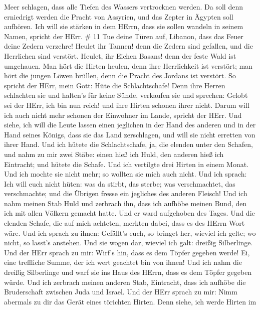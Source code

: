 Meer schlagen, dass alle Tiefen des Wassers vertrocknen werden. Da soll
denn erniedrigt werden die Pracht von Assyrien, und das Zepter in
Ägypten soll aufhören.  Ich will sie stärken in dem HErrn,
dass sie sollen wandeln in seinem Namen, spricht der HErr. \# 11
 Tue deine Türen auf, Libanon, dass das Feuer deine Zedern
verzehre!  Heulet ihr Tannen! denn die Zedern sind gefallen,
und die Herrlichen sind verstört. Heulet, ihr Eichen Basans! denn der
feste Wald ist umgehauen.  Man hört die Hirten heulen, denn
ihre Herrlichkeit ist verstört; man hört die jungen Löwen brüllen, denn
die Pracht des Jordans ist verstört.  So spricht der HErr,
mein Gott: Hüte die Schlachtschafe!  Denn ihre Herren
schlachten sie und halten's für keine Sünde, verkaufen sie und sprechen:
Gelobt sei der HErr, ich bin nun reich! und ihre Hirten schonen ihrer
nicht.  Darum will ich auch nicht mehr schonen der Einwohner
im Lande, spricht der HErr. Und siehe, ich will die Leute lassen einen
jeglichen in der Hand des anderen und in der Hand seines Königs, dass
sie das Land zerschlagen, und will sie nicht erretten von ihrer Hand.
 Und ich hütete die Schlachtschafe, ja, die elenden unter
den Schafen, und nahm zu mir zwei Stäbe: einen hieß ich Huld, den
anderen hieß ich Eintracht; und hütete die Schafe.  Und ich
vertilgte drei Hirten in einem Monat. Und ich mochte sie nicht mehr; so
wollten sie mich auch nicht.  Und ich sprach: Ich will euch
nicht hüten: was da stirbt, das sterbe; was verschmachtet, das
verschmachte; und die Übrigen fresse ein jegliches des anderen Fleisch!
 Und ich nahm meinen Stab Huld und zerbrach ihn, dass ich
aufhöbe meinen Bund, den ich mit allen Völkern gemacht hatte.
 Und er ward aufgehoben des Tages. Und die elenden Schafe,
die auf mich achteten, merkten dabei, dass es des HErrn Wort wäre.
 Und ich sprach zu ihnen: Gefällt's euch, so bringet her,
wieviel ich gelte; wo nicht, so lasst's anstehen. Und sie wogen dar,
wieviel ich galt: dreißig Silberlinge.  Und der HErr sprach
zu mir: Wirf's hin, dass es dem Töpfer gegeben werde! Ei, eine
treffliche Summe, der ich wert geachtet bin von ihnen! Und ich nahm die
dreißig Silberlinge und warf sie ins Haus des HErrn, dass es dem Töpfer
gegeben würde.  Und ich zerbrach meinen anderen Stab,
Eintracht, dass ich aufhöbe die Bruderschaft zwischen Juda und Israel.
 Und der HErr sprach zu mir: Nimm abermals zu dir das Gerät
eines törichten Hirten.  Denn siehe, ich werde Hirten im
